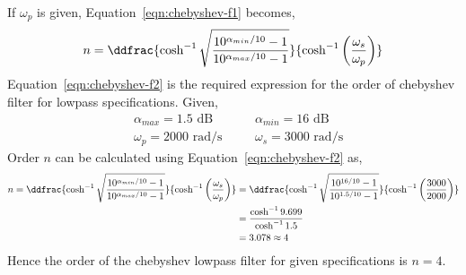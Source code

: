 If $\omega_p$ is given, Equation~\ref{eqn:chebyshev-f1} becomes,
\begin{equation}
    n =\ddfrac{\cosh^{-1}\sqrt{\frac{10^{\alpha_{min}/10}-1}{10^{\alpha_{max}/10}-1}}}{\cosh^{-1} \left(\frac{\omega_s}{\omega_p}\right)}
    \label{eqn:chebyshev-f2}
\end{equation}
Equation~\ref{eqn:chebyshev-f2} is the required expression for the order of chebyshev filter for lowpass specifications.
Given,
\begin{equation*}
   \begin{aligned}
      & \alpha_{max}=1.5 \text{ dB} \quad && \alpha_{min}=16 \text{ dB}\\
      & \omega_p=2000 \text{ rad/s} \quad && \omega_s=3000 \text{ rad/s}
   \end{aligned}
\end{equation*}
Order $n$ can be calculated using Equation~\ref{eqn:chebyshev-f2} as,
\begin{equation*}
   \begin{aligned}
      n=\ddfrac{\cosh^{-1}\sqrt{\frac{10^{\alpha_{min}/10}-1}{10^{\alpha_{max}/10}-1}}}{\cosh^{-1} \left(\frac{\omega_s}{\omega_p}\right)}&=
      \ddfrac{\cosh^{-1}\sqrt{\frac{10^{16/10}-1}{10^{1.5/10}-1}}}{\cosh^{-1} \left(\frac{3000}{2000}\right)}\\
      &=\frac{\cosh^{-1}9.699}{\cosh^{-1}1.5}\\
      &=3.078\approx4
   \end{aligned}
\end{equation*}
Hence the order of the chebyshev lowpass filter for given specifications is $n=4$.



